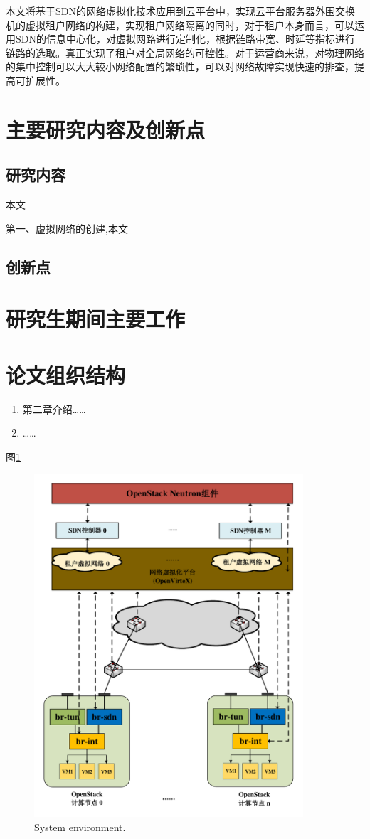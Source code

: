 本文将基于SDN的网络虚拟化技术应用到云平台中，实现云平台服务器外围交换机的虚拟租户网络的构建，实现租户网络隔离的同时，对于租户本身而言，可以运用SDN的信息中心化，对虚拟网路进行定制化，根据链路带宽、时延等指标进行链路的选取。真正实现了租户对全局网络的可控性。对于运营商来说，对物理网络的集中控制可以大大较小网络配置的繁琐性，可以对网络故障实现快速的排查，提高可扩展性。
\section{主要研究内容及创新点}
\subsection{研究内容}
本文

第一、虚拟网络的创建,本文
\subsection{创新点}
\section{研究生期间主要工作}
\section{论文组织结构}


\begin{enumerate}
\item 第二章介绍……
\item ……
\end{enumerate}
图\ref{fig:env1}
\begin{figure}[!htb]
  \centering
  \includegraphics[width=100mm]{logo/architecture}
  \caption{System environment.}
  \label{fig:env1}
\end{figure}

\ifx\usechapbib\empty
\nocite{BSTcontrol}
\setcounter{NAT@ctr}{0}


\fi
